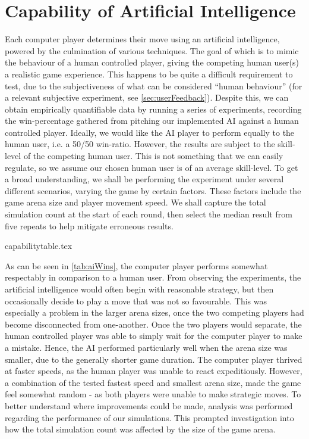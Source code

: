 \documentclass{standalone}
\begin{document}
	\section{Capability of Artificial Intelligence} \label{sec:aiCapabilities}
		Each computer player determines their move using an artificial intelligence, powered by the culmination of various techniques. The goal of which is to mimic the behaviour of a human controlled player, giving the competing human user(s) a realistic game experience. This happens to be quite a difficult requirement to test, due to the subjectiveness of what can be considered \enquote{human behaviour} (for a relevant subjective experiment, see \autoref{sec:userFeedback}). Despite this, we can obtain empirically quantifiable data by running a series of experiments, recording the win-percentage gathered from pitching our implemented AI against a human controlled player. Ideally, we would like the AI player to perform equally to the human user, i.e. a 50/50 win-ratio. However, the results are subject to the skill-level of the competing human user. This is not something that we can easily regulate, so we assume our chosen human user is of an average skill-level. To get a broad understanding, we shall be performing the experiment under several different scenarios, varying the game by certain factors. These factors include the game arena size and player movement speed. We shall capture the total simulation count at the start of each round, then select the median result from five repeats to help mitigate erroneous results.

		{capabilitytable.tex}

		As can be seen in \autoref{tab:aiWins}, the computer player performs somewhat respectably in comparison to a human user. From observing the experiments, the artificial intelligence would often begin with reasonable strategy, but then occasionally decide to play a move that was not so favourable. This was especially a problem in the larger arena sizes, once the two competing players had become disconnected from one-another. Once the two players would separate, the human controlled player was able to simply wait for the computer player to make a mistake. Hence, the AI performed particularly well when the arena size was smaller, due to the generally shorter game duration. The computer player thrived at faster speeds, as the human player was unable to react expeditiously. However, a combination of the tested fastest speed and smallest arena size, made the game feel somewhat random - as both players were unable to make strategic moves. To better understand where improvements could be made, analysis was performed regarding the performance of our simulations. This prompted investigation into how the total simulation count was affected by the size of the game arena.
\end{document}
